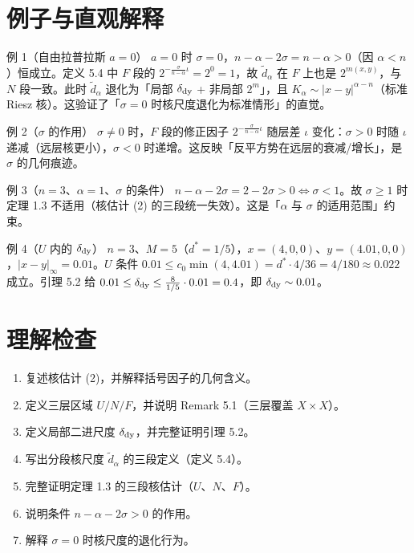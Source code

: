 \documentclass[a4paper,11pt,openany]{ctexbook}
\numberwithin{equation}{chapter}
\numberwithin{figure}{chapter}
\numberwithin{table}{chapter}
\begin{document}
\section{例子与直观解释}

\begin{examplebox}{例 1（自由拉普拉斯 $a=0$）}
$a=0$ 时 $\sigma=0$，$n-\alpha-2\sigma=n-\alpha>0$（因 $\alpha<n$）恒成立。定义 5.4 中 $F$ 段的 $2^{-\frac{\sigma}{n-\alpha}\iota}=2^0=1$，故 $\widetilde d_\alpha$ 在 $F$ 上也是 $2^{m(x,y)}$，与 $N$ 段一致。此时 $\widetilde d_\alpha$ 退化为「局部 $\delta_{\rm dy}$ + 非局部 $2^{m}$」，且 $K_\alpha\sim|x-y|^{\alpha-n}$（标准 Riesz 核）。这验证了「$\sigma=0$ 时核尺度退化为标准情形」的直觉。
\end{examplebox}

\begin{examplebox}{例 2（$\sigma$ 的作用）}
$\sigma\neq0$ 时，$F$ 段的修正因子 $2^{-\frac{\sigma}{n-\alpha}\iota}$ 随层差 $\iota$ 变化：$\sigma>0$ 时随 $\iota$ 递减（远层核更小），$\sigma<0$ 时递增。这反映「反平方势在远层的衰减/增长」，是 $\sigma$ 的几何痕迹。
\end{examplebox}

\begin{examplebox}{例 3（$n=3$、$\alpha=1$、$\sigma$ 的条件）}
$n-\alpha-2\sigma=2-2\sigma>0\iff\sigma<1$。故 $\sigma\ge1$ 时定理 1.3 不适用（核估计 (2) 的三段统一失效）。这是「$\alpha$ 与 $\sigma$ 的适用范围」约束。
\end{examplebox}

\begin{examplebox}{例 4（$U$ 内的 $\delta_{\rm dy}$）}
$n=3$、$M=5$（$d^*=1/5$），$x=(4,0,0)$、$y=(4.01,0,0)$，$|x-y|_\infty=0.01$。$U$ 条件 $0.01\le c_0\min(4,4.01)=d^*\cdot4/36=4/180\approx0.022$ 成立。引理 5.2 给 $0.01\le\delta_{\rm dy}\le\frac8{1/5}\cdot0.01=0.4$，即 $\delta_{\rm dy}\sim0.01$。
\end{examplebox}

\section{理解检查}

\begin{enumerate}
\item 复述核估计 (2)，并解释括号因子的几何含义。
\item 定义三层区域 $U/N/F$，并说明 Remark 5.1（三层覆盖 $X\times X$）。
\item 定义局部二进尺度 $\delta_{\rm dy}$，并完整证明引理 5.2。
\item 写出分段核尺度 $\widetilde d_\alpha$ 的三段定义（定义 5.4）。
\item 完整证明定理 1.3 的三段核估计（$U$、$N$、$F$）。
\item 说明条件 $n-\alpha-2\sigma>0$ 的作用。
\item 解释 $\sigma=0$ 时核尺度的退化行为。
\end{enumerate}
\end{document}
